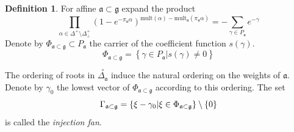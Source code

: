 \documentclass[12pt]{iopart}
\theoremstyle{definition}
\theoremstyle{definition}
\theoremstyle{definition}
\newtheorem{definition}{Definition}
\newcommand{\co}[1]{\stackrel{\circ }{#1}}
\begin{document}
\begin{definition}
  \label{fan-definition}
  For affine $\mathfrak{a}\subset\mathfrak{g}$ expand the product
  \begin{equation*}
    \label{eq:6}
    \prod_{\alpha\in \Delta^{+}\setminus\Delta^{+}_{\bot}}
    \left(1-e^{-\pi_{\mathfrak{a}}\alpha}\right)^{
        \mathrm{mult}(\alpha)-\mathrm{mult}_{\mathfrak{a}}(\pi_{\mathfrak{a}}\alpha)}=
      -\sum_{\gamma\in P_{\mathfrak{a}}}e^{-\gamma}
  \end{equation*}
  Denote by $\Phi_{\mathfrak{a}\subset\mathfrak{g}}\subset P_{\mathfrak{a}}$ the carrier of the coefficient function $s(\gamma)$. 
  \begin{equation*}
    \label{eq:37}
    \Phi_{\mathfrak{a}\subset\mathfrak{g}}=\left\{\gamma\in P_{\mathfrak{a}}|s(\gamma)\neq 0\right\}
  \end{equation*}

  The ordering of roots in $\co{\Delta_{\mathfrak{a}}}$ induce the natural ordering on the weights of $\mathfrak{a}$. Denote by $\gamma_0$ the lowest vector of $    \Phi_{\mathfrak{a}\subset\mathfrak{g}}$ according to this ordering. 
  The set 
  \begin{equation}
    \Gamma _{\frak{a}\subset \frak{g}}=\left\{ \xi -\gamma _{0}|\xi \in \Phi _{%
        \frak{a}\subset \frak{g}}\right\} \setminus \left\{ 0\right\}
    \label{fan-defined}
  \end{equation}
  is called the {\it injection fan}.
\end{definition}
\end{document}
